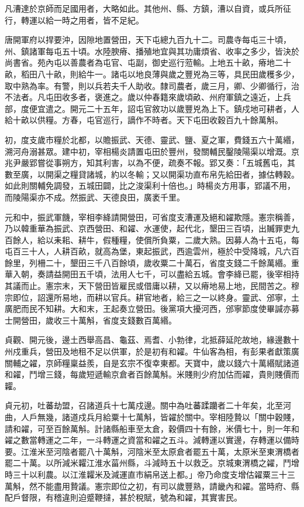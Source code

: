 \begin{pinyinscope}
 凡漕達於京師而足國用者，大略如此。其他州、縣、方鎮，漕以自資，或兵所征行，轉運以給一時之用者，皆不足紀。



 唐開軍府以捍要沖，因隙地置營田，天下屯總九百九十二。司農寺每屯三十頃，州、鎮諸軍每屯五十頃。水陸腴瘠、播殖地宜與其功庸煩省、收率之多少，皆決於尚書省。苑內屯以善農者為屯官、屯副，御史巡行蒞輸。上地五十畝，瘠地二十畝，稻田八十畝，則給牛一。諸屯以地良薄與歲之豐兇為三等，具民田歲穫多少，取中熟為率。有警，則以兵若夫千人助收。隸司農者，歲三月，卿、少卿循行，治不法者。凡屯田收多者，褒進之。歲以仲春籍來歲頃畝、州府軍鎮之遠近，上兵部，度便宜遣之。開元二十五年，詔屯官敘功以歲豐兇為上下。鎮戍地可耕者，人給十畝以供糧。方春，屯官巡行，謫作不時者。天下屯田收穀百九十餘萬斛。



 初，度支歲市糧於北都，以贍振武、天德、靈武、鹽、夏之軍，費錢五六十萬緡，溯河舟溺甚眾。建中初，宰相楊炎請置屯田於豐州，發關輔民鑿陵陽渠以增溉。京兆尹嚴郢嘗從事朔方，知其利害，以為不便，疏奏不報。郢又奏：「五城舊屯，其數至廣，以開渠之糧貸諸城，約以冬輸；又以開渠功直布帛先給田者，據估轉穀。如此則關輔免調發，五城田闢，比之浚渠利十倍也。」時楊炎方用事，郢議不用，而陵陽渠亦不成。然振武、天德良田，廣袤千里。



 元和中，振武軍饑，宰相李絳請開營田，可省度支漕運及絕和糴欺隱。憲宗稱善，乃以韓重華為振武、京西營田、和糴、水運使，起代北，墾田三百頃，出贓罪吏九百餘人，給以耒耜、耕牛，假種糧，使償所負粟，二歲大熟。因募人為十五屯，每屯百三十人，人耕百畝，就高為堡，東起振武，西逾雲州，極於中受降城，凡六百餘里，列柵二十，墾田三千八百餘頃，歲收粟二十萬石，省度支錢二千餘萬緡。重華入朝，奏請益開田五千頃，法用人七千，可以盡給五城。會李絳已罷，後宰相持其議而止。憲宗末，天下營田皆雇民或借庸以耕，又以瘠地易上地，民間苦之。穆宗即位，詔還所易地，而耕以官兵。耕官地者，給三之一以終身。靈武、邠寧，土廣肥而民不知耕。大和末，王起奏立營田。後黨項大擾河西，邠寧節度使畢諴亦募士開營田，歲收三十萬斛，省度支錢數百萬緡。



 貞觀、開元後，邊土西舉高昌、龜茲、焉耆、小勃律，北抵薛延陀故地，緣邊數十州戍重兵，營田及地租不足以供軍，於是初有和糴。牛仙客為相，有彭果者獻策廣關輔之糴，京師糧稟益羨，自是玄宗不復幸東都。天寶中，歲以錢六十萬緡賦諸道和糴，鬥增三錢，每歲短遞輸京倉者百餘萬斛。米賤則少府加估而糴，貴則賤價而糶。



 貞元初，吐蕃劫盟，召諸道兵十七萬戍邊。關中為吐蕃蹂躪者二十年矣，北至河曲，人戶無幾，諸道戍兵月給粟十七萬斛，皆糴於關中。宰相陸贄以「關中穀賤，請和糴，可至百餘萬斛。計諸縣船車至太倉，穀價四十有餘，米價七十，則一年和糴之數當轉運之二年，一斗轉運之資當和糴之五斗。減轉運以實邊，存轉運以備時要。江淮米至河陰者罷八十萬斛，河陰米至太原倉者罷五十萬，太原米至東渭橋者罷二十萬。以所減米糶江淮水菑州縣，斗減時五十以救乏。京城東渭橋之糴，鬥增時三十以利農。以江淮糶米及減運直市絹帛送上都。」帝乃命度支增估糴粟三十三萬斛，然不能盡用贄議。憲宗即位之初，有司以歲豐熟，請畿內和糴。當時府、縣配戶督限，有稽違則迫蹙鞭撻，甚於稅賦，號為和糴，其實害民。



\end{pinyinscope}